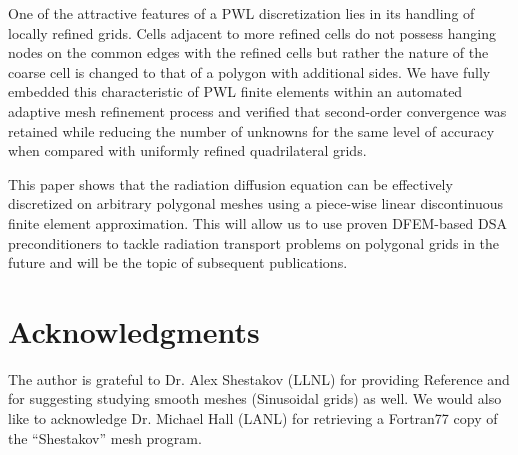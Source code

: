 \documentclass[preprint,10pt]{elsarticle}
\newcommand{\tcr}[1]{\textcolor{red}{#1}}
\begin{document}
One of the attractive features of a PWL discretization lies in its handling of locally refined grids.
Cells adjacent to more refined cells do not possess hanging nodes on the common edges with the refined cells
but rather the nature of the coarse cell is changed to that of a polygon with additional sides. We have
fully embedded this characteristic of PWL finite elements within an automated adaptive mesh refinement process
and verified that second-order convergence was retained while reducing the number of unknowns for the same 
level of accuracy when compared with uniformly refined quadrilateral grids.


This paper shows that the radiation diffusion equation can be effectively discretized on arbitrary 
polygonal meshes using a piece-wise linear discontinuous finite element approximation. 
This will allow us to use proven DFEM-based DSA preconditioners \cite{Ragusa_Wang_NSE_2010} to tackle 
radiation transport problems on polygonal grids in the future and will be the topic of subsequent 
publications.
%
 

\section*{Acknowledgments} 

The author is grateful to Dr. Alex Shestakov (LLNL) for providing Reference \cite{Sheshakov1990}
and for suggesting studying smooth meshes (Sinusoidal grids) as well. We would also like to
acknowledge Dr. Michael Hall (LANL) for retrieving a Fortran77 copy of the ``Shestakov'' mesh program. 
\end{document}
